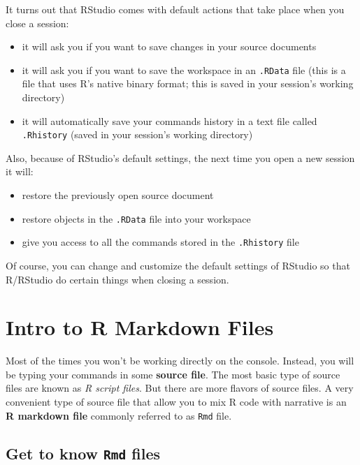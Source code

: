 \documentclass[
]{book}
\begin{document}
It turns out that RStudio comes with default actions that take place
when you close a session:

\begin{itemize}
\item
  it will ask you if you want to save changes in your source documents
\item
  it will ask you if you want to save the workspace in an \texttt{.RData} file
  (this is a file that uses R's native binary format; this is saved in your
  session's working directory)
\item
  it will automatically save your commands history in a text file called
  \texttt{.Rhistory} (saved in your session's working directory)
\end{itemize}

Also, because of RStudio's default settings, the next time you open a new
session it will:

\begin{itemize}
\item
  restore the previously open source document
\item
  restore objects in the \texttt{.RData} file into your workspace
\item
  give you access to all the commands stored in the \texttt{.Rhistory} file
\end{itemize}

Of course, you can change and customize the default settings of RStudio so
that R/RStudio do certain things when closing a session.

\hypertarget{rmdfiles}{%
\chapter{Intro to R Markdown Files}\label{rmdfiles}}

Most of the times you won't be working directly on the console.
Instead, you will be typing your commands in some \textbf{source file}.
The most basic type of source files are known as \emph{R script files}.
But there are more flavors of source files. A very convenient type of source
file that allow you to mix R code with narrative is an \textbf{R markdown file}
commonly referred to as \texttt{Rmd} file.

\hypertarget{get-to-know-rmd-files}{%
\section{\texorpdfstring{Get to know \texttt{Rmd} files}{Get to know Rmd files}}\label{get-to-know-rmd-files}}
\end{document}
